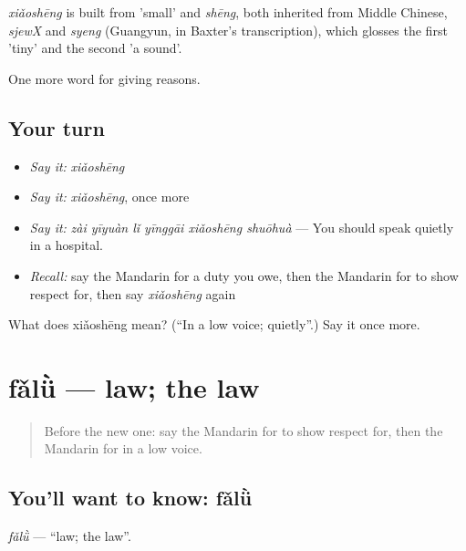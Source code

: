\begin{cousinweb}
\emph{xiǎoshēng} is built from  'small' and \emph{shēng}, both inherited from Middle Chinese, \emph{sjewX} and \emph{syeng} (Guangyun, in Baxter's transcription), which glosses the first 'tiny' and the second 'a sound'.
\end{cousinweb}

\begin{grammarlens}[title={What you've built}]
One more word for giving reasons.
\end{grammarlens}

\subsection*{Your turn}
\begin{itemize}
\raggedright
  \item \emph{Say it:} \emph{xiǎoshēng}
  \item \emph{Say it:} \emph{xiǎoshēng}, once more
  \item \emph{Say it:} \emph{zài yīyuàn lǐ yīnggāi xiǎoshēng shuōhuà} — You should speak quietly in a hospital.
  \item \emph{Recall:} say the Mandarin for a duty you owe, then the Mandarin for to show respect for, then say \emph{xiǎoshēng} again
\end{itemize}

\begin{tcolorbox}[breakable,colback=teal!4,colframe=teal!35!black,title={Before you move on}]
What does xiǎoshēng mean? (\textquotedblleft{}In a low voice; quietly\textquotedblright{}.) Say it once more.
\end{tcolorbox}
\section[fǎlǜ]{fǎlǜ — law; the law}

\label{lesson:ZH-C363-falu}



\begin{quote}
Before the new one: say the Mandarin for to show respect for, then the Mandarin for in a low voice.
\end{quote}

\subsection*{You'll want to know: fǎlǜ}
\emph{fǎlǜ} — \textquotedblleft{}law; the law\textquotedblright{}.

